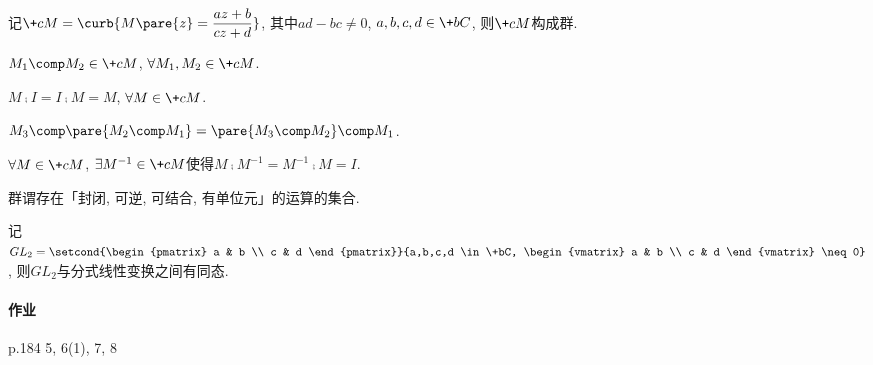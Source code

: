 \documentclass{ctexart}
\begin{document}
\begin{theorem}
    记$\displaystyle \+cM = \curb{M\pare{z} = \frac{az+b}{cz+d}}$, 其中$ad-bc\neq 0$, $a,b,c,d\in \+bC$, 则$\+cM$构成群.
    \begin{cenum}
        \item $M_1\comp M_2 \in \+cM$, $\forall M_1,M_2\in \+cM$.
        \item $M\comp I = I\comp M = M$, $\forall M\in \+cM$.
        \item $M_3 \comp \pare{M_2\comp M_1} = \pare{M_3 \comp M_2} \comp M_1$.
        \item $\forall M\in \+cM$, $\exists M^{-1}\in \+cM$使得$M\comp M^{-1} = M^{-1}\comp M = I$.
    \end{cenum}
\end{theorem}
\begin{remark}
    群谓存在「封闭, 可逆, 可结合, 有单位元」的运算的集合.
\end{remark}
\begin{ex}
    记$GL_2 = \displaystyle \setcond{\begin{pmatrix}
        a & b \\
        c & d
    \end{pmatrix}}{a,b,c,d \in \+bC, \begin{vmatrix}
        a & b \\
        c & d
    \end{vmatrix} \neq 0}$, 则$GL_2$与分式线性变换之间有同态.
\end{ex}

\paragraph{作业} %
\label{par:作业}

p.184 5, 6(1), 7, 8

\end{document}
